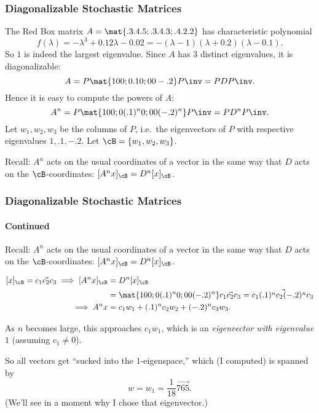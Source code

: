\begin{frame}
\frametitle{Diagonalizable Stochastic Matrices}

The Red Box matrix $A = \mat{.3 .4 .5; .3 .4 .3; .4 .2 .2}$ has characteristic
polynomial
\[ f(\lambda) = -\lambda^3 + 0.12\lambda - 0.02 =
-(\lambda-1)(\lambda+0.2)(\lambda-0.1). \]
\pause
So $1$ is indeed the largest eigenvalue.
\pause
Since $A$ has $3$ distinct eigenvalues, it is diagonalizable:
\[ A = P\mat{1 0 0; 0 .1 0; 0 0 -.2}P\inv = PDP\inv. \]
\pause
Hence it is easy to compute the powers of $A$:
\[ A^n = P\mat{1 0 0; 0 (.1)^n 0; 0 0 (-.2)^n}P\inv = PD^nP\inv. \]
\pause
Let $w_1,w_2,w_3$ be the columns of $P$, i.e.\ the eigenvectors of $P$ with
respective eigenvalues $1,.1,-.2$.  Let $\cB = \{w_1,w_2,w_3\}$.

\pause\medskip
\alert{Recall:} $A^n$ acts on the usual coordinates of a vector in the same way
that $D$ acts on the $\cB$-coordinates: $[A^nx]_\cB = D^n[x]_\cB$.

\end{frame}



\begin{frame}
\frametitle{Diagonalizable Stochastic Matrices}
\framesubtitle{Continued}

\alert{Recall:} $A^n$ acts on the usual coordinates of a vector in the same way
that $D$ acts on the $\cB$-coordinates: $[A^nx]_\cB = D^n[x]_\cB$.
\begin{webonly}
\[\begin{split}
  [x]_\cB = \vec{c_1 c_2 c_3} 
  \implies [A^nx]_\cB &= D^n[x]_\cB \\
  &= \mat{1 0 0; 0 (.1)^n 0; 0 0 (-.2)^n}\vec{c_1 c_2 c_3}
  = \vec{c_1 (.1)^nc_2 (-.2)^nc_3} \\
  \implies A^nx &= c_1w_1 + (.1)^nc_2w_2 + (-.2)^nc_3w_3.
\end{split}\]
\end{webonly}%
\pause
As $n$ becomes large, this approaches $c_1w_1$, which is an
\emph{eigenvector with eigenvalue $1$} (assuming $c_1\neq 0$).

\pause\medskip
So all vectors get ``sucked into the $1$-eigenspace,'' which (I computed) is spanned
by
\[ w = w_1 = \frac 1{18}\vec{7 6 5}. \]
\pause
(We'll see in a moment why I chose that eigenvector.)

\end{frame}




